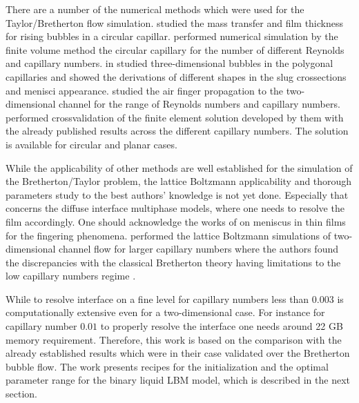 \documentclass{article}
\begin{document}
There are a number of the numerical methods which
were used for the Taylor/Bretherton flow
simulation. \citet{vanbaten-circular} studied the mass transfer and film
thickness for rising bubbles in a circular capillar.
\citet{kreutzer-pressure-drop} performed numerical simulation by the
finite volume method the circular capillary for the number of different
Reynolds and capillary numbers. \citeauthor{wong-films} in
\cite{wong-films,wong-pressure} studied three-dimensional bubbles in the
polygonal capillaries and showed the derivations of different shapes in the
slug crossections and menisci appearance.
\citet{heil-bretherton,ingham-plates} studied the air finger propagation to
the two-dimensional channel for the range of Reynolds numbers and capillary
numbers. \citet{giavedoni-numerical} performed crossvalidation of the
finite element solution developed by them with the already published results
across the different capillary numbers. The solution is available for circular
and planar cases. 

While the applicability of other methods are well established for the
simulation of the Bretherton/Taylor problem, the lattice Boltzmann
applicability and thorough parameters study to the best authors' knowledge is
not yet done. Especially that concerns the diffuse interface multiphase
models, where one needs to resolve the film accordingly. One should acknowledge
the works of
\citet{pagonabarraga-fingers} on meniscus in thin films for the fingering
phenomena. \citet{sehgal-microchannel} performed the lattice Boltzmann
simulations of two-dimensional channel flow for larger capillary numbers where
the authors found the discrepancies with the classical Bretherton theory having
limitations to the low capillary numbers regime \cite{giavedoni-numerical}.

While to resolve interface on a fine level for capillary numbers less than
$0.003$ is computationally extensive even for a two-dimensional case. For
instance for capillary number $0.01$ to properly resolve the interface one
needs around 22 GB memory requirement. Therefore, this work is based on the
comparison with the already established results which were in their case
validated over the Bretherton bubble flow. The work presents recipes for the
initialization and the optimal parameter range for the binary liquid LBM model,
which is described in the next section. 
\end{document}
